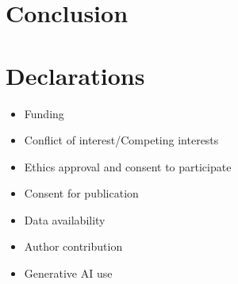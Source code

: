 \documentclass[pdflatex,sn-mathphys-num]{sn-jnl}
\begin{document}
\section{Conclusion}\label{sec:conclusion}

\backmatter


\section*{Declarations}

\begin{itemize}
\item Funding
\item Conflict of interest/Competing interests
\item Ethics approval and consent to participate
\item Consent for publication
\item Data availability
\item Author contribution
\item Generative AI use
\end{itemize}

\begin{appendices}

\section{}\label{app:1}

\subsection{}\label{app:1.1}

\end{appendices}


\end{document}
